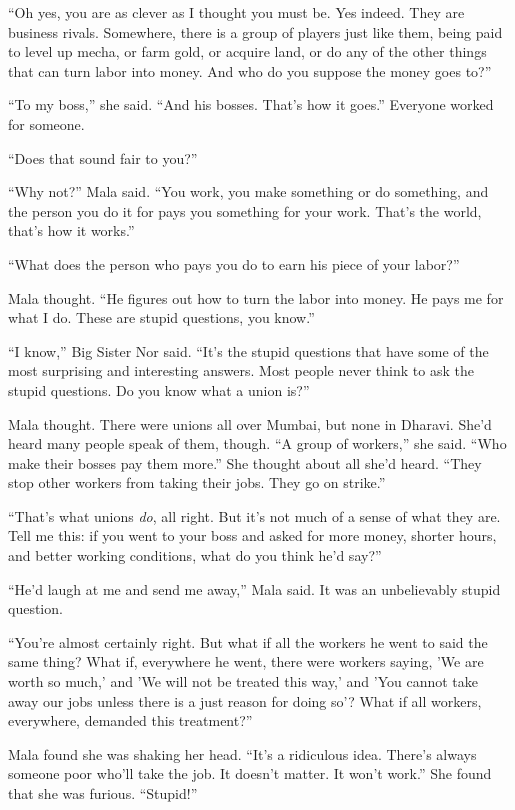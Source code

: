 ``Oh yes, you are as clever as I thought you must be. Yes indeed.
They are business rivals. Somewhere, there is a group of players
just like them, being paid to level up mecha, or farm gold, or
acquire land, or do any of the other things that can turn labor
into money. And who do you suppose the money goes to?''

``To my boss,'' she said. ``And his bosses. That's how it goes.''
Everyone worked for someone.

``Does that sound fair to you?''

``Why not?'' Mala said. ``You work, you make something or do
something, and the person you do it for pays you something for your
work. That's the world, that's how it works.''

``What does the person who pays you do to earn his piece of your
labor?''

Mala thought. ``He figures out how to turn the labor into money. He
pays me for what I do. These are stupid questions, you know.''

``I know,'' Big Sister Nor said. ``It's the stupid questions that have
some of the most surprising and interesting answers. Most people
never think to ask the stupid questions. Do you know what a union
is?''

Mala thought. There were unions all over Mumbai, but none in
Dharavi. She'd heard many people speak of them, though. ``A group of
workers,'' she said. ``Who make their bosses pay them more.'' She
thought about all she'd heard. ``They stop other workers from taking
their jobs. They go on strike.''

``That's what unions \emph{do}, all right. But it's not much of a
sense of what they are. Tell me this: if you went to your boss and
asked for more money, shorter hours, and better working conditions,
what do you think he'd say?''

``He'd laugh at me and send me away,'' Mala said. It was an
unbelievably stupid question.

``You're almost certainly right. But what if all the workers he went
to said the same thing? What if, everywhere he went, there were
workers saying, 'We are worth so much,' and 'We will not be treated
this way,' and 'You cannot take away our jobs unless there is a
just reason for doing so'? What if all workers, everywhere,
demanded this treatment?''

Mala found she was shaking her head. ``It's a ridiculous idea.
There's always someone poor who'll take the job. It doesn't matter.
It won't work.'' She found that she was furious. ``Stupid!''

